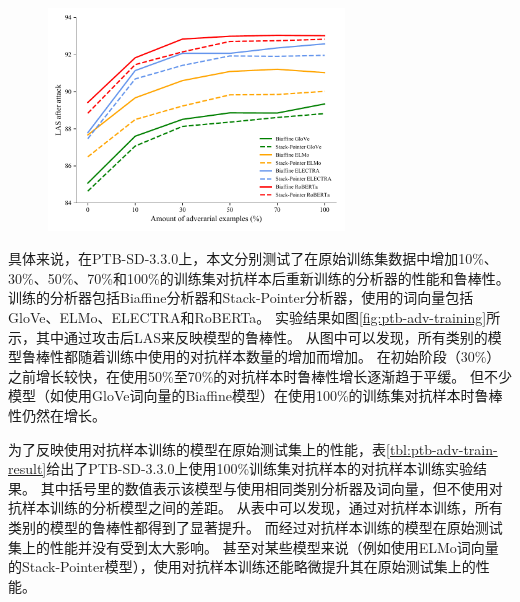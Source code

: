 \begin{figure}[hbtp]
	\centering
	\includegraphics[width=0.7\textwidth]{figures/adv_training_after_attack.pdf}
\end{figure}

具体来说，在PTB-SD-3.3.0上，本文分别测试了在原始训练集数据中增加10\%、30\%、50\%、70\%和100\%的训练集对抗样本后重新训练的分析器的性能和鲁棒性。
训练的分析器包括Biaffine分析器和Stack-Pointer分析器，使用的词向量包括GloVe、ELMo、ELECTRA和RoBERTa。
实验结果如图\ref{fig:ptb-adv-training}所示，其中通过攻击后LAS来反映模型的鲁棒性。
从图中可以发现，所有类别的模型鲁棒性都随着训练中使用的对抗样本数量的增加而增加。
在初始阶段（30\%）之前增长较快，在使用50\%至70\%的对抗样本时鲁棒性增长逐渐趋于平缓。
但不少模型（如使用GloVe词向量的Biaffine模型）在使用100\%的训练集对抗样本时鲁棒性仍然在增长。

为了反映使用对抗样本训练的模型在原始测试集上的性能，表\ref{tbl:ptb-adv-train-result}给出了PTB-SD-3.3.0上使用100\%训练集对抗样本的对抗样本训练实验结果。
其中括号里的数值表示该模型与使用相同类别分析器及词向量，但不使用对抗样本训练的分析模型之间的差距。
从表中可以发现，通过对抗样本训练，所有类别的模型的鲁棒性都得到了显著提升。
而经过对抗样本训练的模型在原始测试集上的性能并没有受到太大影响。
甚至对某些模型来说（例如使用ELMo词向量的Stack-Pointer模型），使用对抗样本训练还能略微提升其在原始测试集上的性能。

